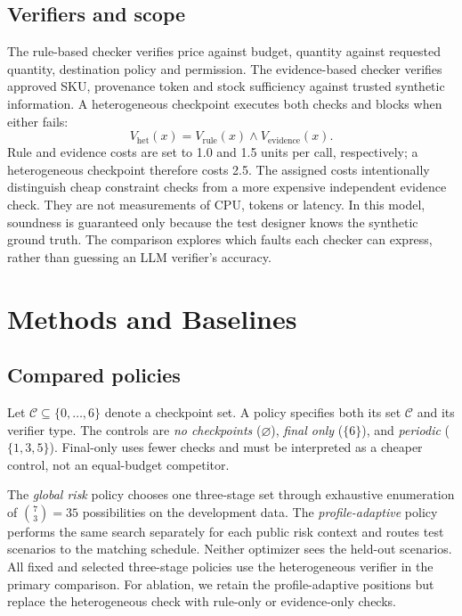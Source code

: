 \documentclass[conference]{IEEEtran}
\begin{document}
\subsection{Verifiers and scope}
The rule-based checker verifies price against budget, quantity against requested quantity, destination policy and permission. The evidence-based checker verifies approved SKU, provenance token and stock sufficiency against trusted synthetic information. A heterogeneous checkpoint executes both checks and blocks when either fails:
\begin{equation}
V_{\mathrm{het}}(x)=V_{\mathrm{rule}}(x)\land V_{\mathrm{evidence}}(x).
\end{equation}
Rule and evidence costs are set to 1.0 and 1.5 units per call, respectively; a heterogeneous checkpoint therefore costs 2.5. The assigned costs intentionally distinguish cheap constraint checks from a more expensive independent evidence check. They are not measurements of CPU, tokens or latency. In this model, soundness is guaranteed only because the test designer knows the synthetic ground truth. The comparison explores which faults each checker can express, rather than guessing an LLM verifier's accuracy.

\section{Methods and Baselines}
\subsection{Compared policies}
Let $\mathcal{C}\subseteq\{0,\ldots,6\}$ denote a checkpoint set. A policy specifies both its set $\mathcal{C}$ and its verifier type. The controls are \emph{no checkpoints} ($\varnothing$), \emph{final only} ($\{6\}$), and \emph{periodic} ($\{1,3,5\}$). Final-only uses fewer checks and must be interpreted as a cheaper control, not an equal-budget competitor.

The \emph{global risk} policy chooses one three-stage set through exhaustive enumeration of $\binom{7}{3}=35$ possibilities on the development data. The \emph{profile-adaptive} policy performs the same search separately for each public risk context and routes test scenarios to the matching schedule. Neither optimizer sees the held-out scenarios. All fixed and selected three-stage policies use the heterogeneous verifier in the primary comparison. For ablation, we retain the profile-adaptive positions but replace the heterogeneous check with rule-only or evidence-only checks.
\end{document}
